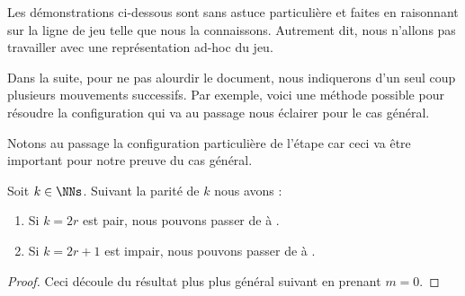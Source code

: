Les démonstrations ci-dessous sont sans astuce particulière et faites en raisonnant sur la ligne de jeu telle que nous la connaissons. Autrement dit, nous n'allons pas travailler avec une représentation ad-hoc du jeu.


\begin{remark}
	Dans la suite, pour ne pas alourdir le document, nous indiquerons d'un seul coup plusieurs mouvements successifs.
	Par exemple, voici une méthode possible pour résoudre la configuration  qui va au passage nous éclairer pour le cas général.
	\begin{mvts}
		\medskip
		\item  {}

		\medskip
		\item  {}

		\medskip
		\item  {}

		\medskip
		\item  {}

		\medskip
		\item  {}
	\end{mvts}

	Notons au passage la configuration particulière de l'étape  car ceci va être important pour notre preuve du cas général. 
\end{remark}



\begin{fact} \label{kNkB-reduction}
	Soit $k \in \NNs$. Suivant la parité de $k$ nous avons :
	\begin{enumerate}
		\item Si $k = 2r$ est pair, nous pouvons passer de  à  .

		\item Si $k = 2r+1$ est impair, nous pouvons passer de  à  .
	\end{enumerate}
\end{fact}


\begin{proof}
	Ceci découle du résultat plus plus général suivant en prenant $m = 0$.
\end{proof}



